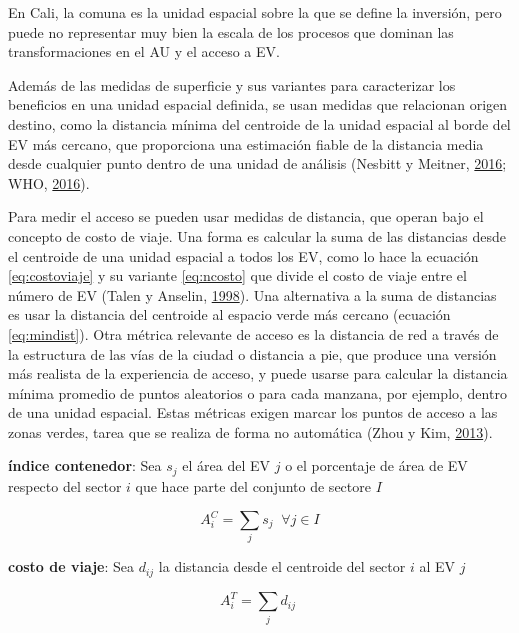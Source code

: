 \documentclass[12pt,a4paper,oneside, openany]{book}
\theoremstyle{definition}
\theoremstyle{definition}
\theoremstyle{definition}
\theoremstyle{remark}
\begin{document}
En Cali, la comuna es la unidad espacial sobre la que se define la
inversión, pero puede no representar muy bien la escala de los procesos
que dominan las transformaciones en el AU y el acceso a EV.

Además de las medidas de superficie y sus variantes para caracterizar
los beneficios en una unidad espacial definida, se usan medidas que
relacionan origen destino, como la distancia mínima del centroide de la
unidad espacial al borde del EV más cercano, que proporciona una
estimación fiable de la distancia media desde cualquier punto dentro de
una unidad de análisis (Nesbitt y Meitner,
\protect\hyperlink{ref-nesbitt_exploring_2016}{2016}; WHO,
\protect\hyperlink{ref-who2016urban}{2016}).

Para medir el acceso se pueden usar medidas de distancia, que operan
bajo el concepto de costo de viaje. Una forma es calcular la suma de las
distancias desde el centroide de una unidad espacial a todos los EV,
como lo hace la ecuación \eqref{eq:costoviaje} y su variante
\eqref{eq:ncosto} que divide el costo de viaje entre el número de EV
(Talen y Anselin, \protect\hyperlink{ref-talen_assessing_1998}{1998}).
Una alternativa a la suma de distancias es usar la distancia del
centroide al espacio verde más cercano (ecuación \eqref{eq:mindist}). Otra
métrica relevante de acceso es la distancia de red a través de la
estructura de las vías de la ciudad o distancia a pie, que produce una
versión más realista de la experiencia de acceso, y puede usarse para
calcular la distancia mínima promedio de puntos aleatorios o para cada
manzana, por ejemplo, dentro de una unidad espacial. Estas métricas
exigen marcar los puntos de acceso a las zonas verdes, tarea que se
realiza de forma no automática (Zhou y Kim,
\protect\hyperlink{ref-zhou_social_2013}{2013}).

\textbf{índice contenedor}: Sea \(s_j\) el área del EV \(j\) o el
porcentaje de área de EV respecto del sector \(i\) que hace parte del
conjunto de sectore \(I\)

\begin{equation}
A^{C}_i =\sum_j{s_j} \;  \; \forall  j \in I
\label{eq:contenedor}
\end{equation}

\textbf{costo de viaje}: Sea \(d_{ij}\) la distancia desde el centroide
del sector \(i\) al EV \(j\)

\begin{equation}
A^{T}_i =\sum_j{d_{ij}} \; 
\label{eq:costoviaje}
\end{equation}
\end{document}
